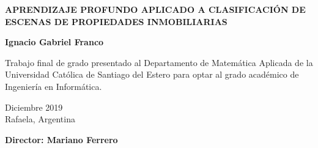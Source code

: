 \begin{titlepage}
	
	\begin{center}
		
		\vspace*{4\baselineskip}
	
		
		{\LARGE \textbf{APRENDIZAJE PROFUNDO APLICADO A CLASIFICACIÓN DE ESCENAS DE PROPIEDADES INMOBILIARIAS \\}}
		        \vspace*{1.5\baselineskip}

		
        \vspace*{1,5\baselineskip}

		\large{\textbf{Ignacio Gabriel Franco}}\\
		
		\vspace{1,5\baselineskip}
		
		\large{Trabajo final de grado presentado al Departamento de Matemática Aplicada de la Universidad Católica de Santiago del Estero para optar al grado académico de Ingeniería en Informática.} 
		
		\vspace{1,5\baselineskip}
		Diciembre 2019\\
		Rafaela, Argentina 
\vspace{1,5\baselineskip}

		\large{\textbf{Director: Mariano Ferrero}}\\ 

	\end{center}
	
	
\end{titlepage}